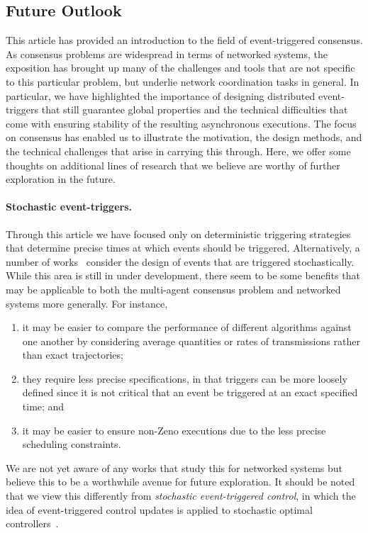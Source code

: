 \documentclass{autart}
\begin{document}
{
\subsection{Future Outlook}\label{se:outlook}

This article has provided an introduction to the field of
event-triggered consensus. As consensus problems are widespread in
terms of networked systems, the exposition has brought up many of the
challenges and tools that are not specific to this particular problem,
but underlie network coordination tasks in general. In particular, we
have highlighted the importance of designing distributed
event-triggers that still guarantee global properties and the
technical difficulties that come with ensuring stability of the
resulting asynchronous executions. The focus on consensus has enabled
us to illustrate the motivation, the design methods, and the technical
challenges that arise in carrying this through. Here, we offer some
thoughts on additional lines of research that we believe are worthy of further
exploration in the future.

{
  \paragraph*{Stochastic event-triggers.} Through this article we have
  focused only on deterministic triggering strategies that determine
  precise times at which events should be triggered. Alternatively, a
  number of works~\citep{DH-YM-JW-SW-BS-LS:15,FDB-DA-FA:18,DA:13}
  consider the design of events that are triggered
  stochastically. While this area is still in under development, there
  seem to be some benefits that may be applicable to both the
  multi-agent consensus problem and networked systems more
  generally. For instance,
  \begin{enumerate}
  \item it may be easier to compare the performance of different
    algorithms against one another by considering average quantities
    or rates of transmissions rather than exact trajectories;
  \item they require less precise specifications, in that triggers can
    be more loosely defined since it is not critical that an event be
    triggered at an exact specified time; and
  \item it may be easier to ensure non-Zeno executions due to the less
    precise scheduling constraints.
  \end{enumerate}
  We are not yet aware of any works that study this for networked
  systems but believe this to be a worthwhile avenue for future
  exploration.  It should be noted that we view this differently from
  \emph{stochastic event-triggered control}, in which the idea of
  event-triggered control updates is applied to stochastic optimal
  controllers~\citep{YX-JPH:05,MR-JSB:07,AM-SH:09,AM-SH:10}.}


}
\end{document}
